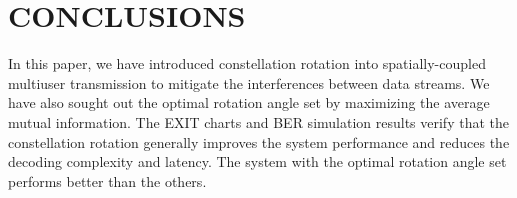\documentclass[conference]{IEEEtran}
\begin{document}
\section{CONCLUSIONS}
In this paper, we have introduced constellation rotation into spatially-coupled multiuser transmission to mitigate the interferences between data streams. We have also sought out the optimal rotation angle set by maximizing the average mutual information. The EXIT charts and BER simulation results verify that the constellation rotation generally improves the system performance and reduces the decoding complexity and latency. The system with the optimal rotation angle set performs better than the others.









\end{document}
